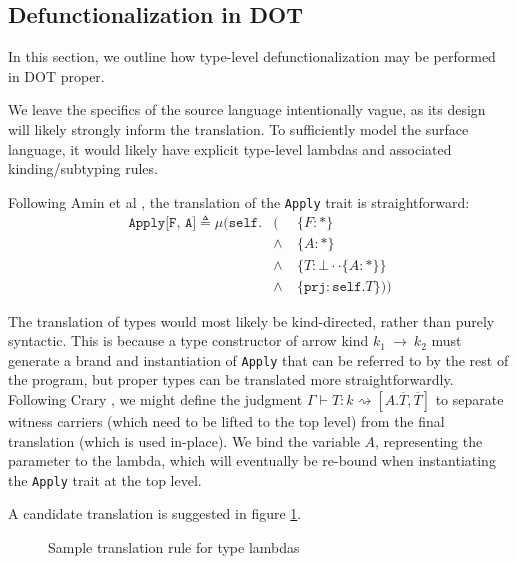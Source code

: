 \documentclass[acmsmall,screen]{acmart}
\begin{document}
\begin{appendices}
  \section{Defunctionalization in DOT}\label{appendix::dot}

  In this section, we outline how type-level defunctionalization may be
  performed in DOT proper.

  We leave the specifics of the source language intentionally vague, as its
  design will likely strongly inform the translation. To sufficiently model the
  surface language, it would likely have explicit type-level lambdas and
  associated kinding/subtyping rules.

  Following Amin et al \cite{amin2016dependent}, the translation of the
  \texttt{Apply} trait is straightforward:
  \begin{equation}
    \begin{aligned}
      \texttt{Apply[F, A]} \triangleq \mu (\texttt{self} .
        &(\ &\{ F : * \} \\
        &\land\ &\{ A : * \} \\
        &\land\ &\{ T : \bot \cdot \cdot \{ A : * \} \} \\
        &\land\ &\{ \texttt{prj} : \texttt{self}.T \}))
    \end{aligned}
  \end{equation}

  The translation of types would most likely be kind-directed, rather than
  purely syntactic. This is because a type constructor of arrow kind
  $k_1~\rightarrow~k_2$ must generate a brand and instantiation of
  \texttt{Apply} that can be referred to by the rest of the program, but proper
  types can be translated more straightforwardly. Following Crary
  \cite{CraryFAMC}, we might define the judgment $\Gamma \vdash T:k
  \rightsquigarrow [A.\overline{T}, \overline{T}]$ to separate witness carriers
  (which need to be lifted to the top level) from the final translation (which
  is used in-place). We bind the variable $A$, representing the parameter to
  the lambda, which will eventually be re-bound when instantiating the
  \texttt{Apply} trait at the top level.

  A candidate translation is suggested in figure \ref{fig::sample}.

  \begin{figure}[ht]
    \begin{prooftree}
    \end{prooftree}
    \caption{Sample translation rule for type lambdas}
    \label{fig::sample}
  \end{figure}


\end{appendices}
\end{document}
